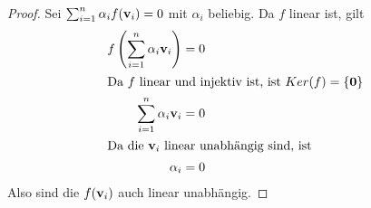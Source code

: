 \documentclass{../mfa}
\begin{document}
\begin{proof}
   Sei $\sum_{i=1}^n \alpha_i f(\mathbf{v}_{i}) = 0$ mit $\alpha_i$ beliebig. Da $f$
   linear ist, gilt 
   \begin{align*}
      f\left(\sum_{i=1}^n \alpha_i \mathbf{v}_{i}\right) & = 0 \\
      \intertext{Da $f$ linear und injektiv ist, ist $Ker(f)=\{\mathbf{0}\}$}
      \sum_{i=1}^n \alpha_i \mathbf{v}_{i} &= 0 \\
      \intertext{Da die $\mathbf{v}_{i}$ linear unabhängig sind, ist}
      \alpha_i &= 0
   \end{align*}
   Also sind die $f(\mathbf{v}_{i})$ auch linear unabhängig.
\end{proof}
\end{document}
